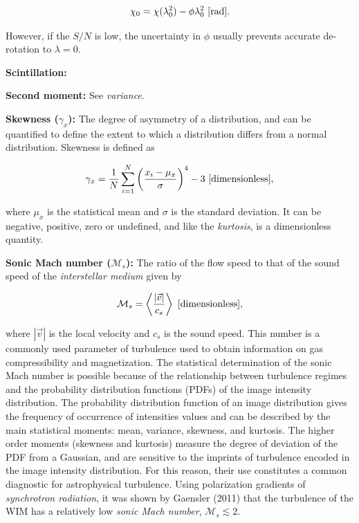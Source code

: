\documentclass[a4paper,10pt]{article}
\begin{document}
\begin{align*}
    \chi_0 = \chi(\lambda_0^2) - \phi\lambda_0^2 ~ [{\rm rad}].
\end{align*}

{\noindent}However, if the $S/N$ is low, the uncertainty in $\phi$ usually prevents accurate de-rotation to $\lambda=0$. 

{\noindent}\textbf{Scintillation:}

{\noindent}\textbf{Second moment:} See \textit{variance}.

{\noindent}\textbf{Skewness ($\gamma_x$):} The degree of asymmetry of a distribution, and can be quantified to define the extent to which a distribution differs from a normal distribution. Skewness is defined as

\begin{align*}
    \gamma_x = \frac{1}{N} \sum_{i=1}^N \left(\frac{x_i-\mu_x}{\sigma}\right)^4 -3 ~ [{\rm dimensionless}],
\end{align*}

{\noindent}where $\mu_x$ is the statistical mean and $\sigma$ is the standard deviation. It can be negative, positive, zero or undefined, and like the \textit{kurtosis}, is a dimensionless quantity.

{\noindent}\textbf{Sonic Mach number ($\mathcal{M}_s$):} The ratio of the flow speed to that of the sound speed of the \textit{interstellar medium} given by

\begin{align*}
    \mathcal{M}_s = \left\langle\frac{\lvert\vec{v}\rvert}{c_s}\right\rangle ~ [{\rm dimensionless}],
\end{align*}

{\noindent}where $|\vec{v}|$ is the local velocity and $c_s$ is the sound speed. This number is a commonly used parameter of turbulence used to obtain information on gas compressibility and magnetization. The statistical determination of the sonic Mach number is possible because of the relationship between turbulence regimes and the probability distribution functions (PDFs) of the image intensity distribution. The probability distribution function of an image distribution gives the frequency of occurrence of intensities values and can be described by the main statistical moments: mean, variance, skewness, and kurtosis. The higher order moments (skewness and kurtosis) measure the degree of deviation of the PDF from a Gaussian, and are sensitive to the imprints of turbulence encoded in the image intensity distribution. For this reason, their use constitutes a common diagnostic for astrophysical turbulence. Using polarization gradients of \textit{synchrotron radiation}, it was shown by Gaensler (2011) that the turbulence of the WIM has a relatively low \textit{sonic Mach number}, $\mathcal{M}_s\lesssim2$.
\end{document}
